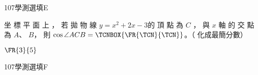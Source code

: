 \begin{QUESTIONS}
\begin{QUESTION}
    \end{QUESTION}
    \begin{QUESTION}
        \begin{ExamInfo}{107}{學測}{選填}{E}
        \end{ExamInfo}
        \begin{ExamAnsRateInfo}{}{}{}{}
        \end{ExamAnsRateInfo}
        \begin{QBODY}
                        坐 標 平 面 上 ， 若 拋 物 線 $ y = x^2 +2x-3$的 頂 點 為 $C$ ， 與 $x$ 軸 的 交 點 為 $A$、 $B$， 則
            $\cos \angle ACB = \TCNBOX{\FR{\TCN}{\TCN}} $。（ 化成最簡分數）
        \end{QBODY}
        \begin{QFROMS}
        \end{QFROMS}
        \begin{QTAGS}\end{QTAGS}
        \begin{QANS}
            $\FR{3}{5}$
        \end{QANS}
        \begin{QSOLLIST}
        \end{QSOLLIST}
        \begin{QEMPTYSPACE}
        \end{QEMPTYSPACE}
    \end{QUESTION}
    \begin{QUESTION}
        \begin{ExamInfo}{107}{學測}{選填}{F}
        \end{ExamInfo}
        \begin{ExamAnsRateInfo}{}{}{}{}
        \end{ExamAnsRateInfo}
\end{QUESTION}
\end{QUESTIONS}

